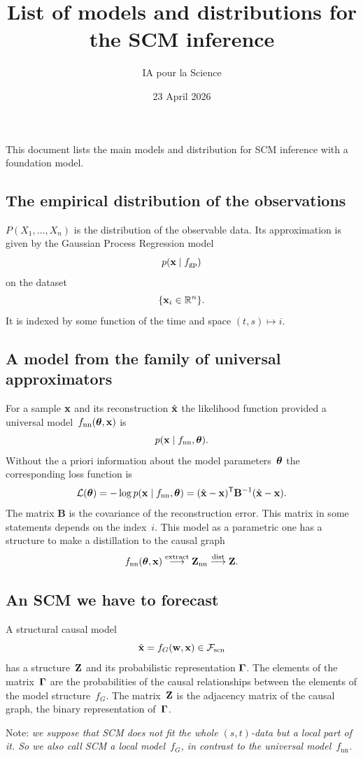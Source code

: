 \documentclass[12pt]{article}
\title{List of models and distributions for the SCM inference}
\author{IA pour la Science}
\date{23 April 2026}
\begin{document}
\maketitle

This document lists the main models and distribution for SCM inference with a foundation model.

\subsection*{The empirical distribution of the observations}
$P(X_1,\dots,X_n)$ is the distribution of the observable data.
Its approximation is given by the Gaussian Process Regression model
\[
p(\mathbf{x} \mid f_\text{gp})
\]
on the dataset~
\[\{\mathbf{x}_i\in\mathbb{R}^n\}.\]
It is indexed by some function of the time and space $(t,s)\mapsto i$.

\subsection*{A model from the family of universal approximators}
For a sample $\mathbf{x}$ and its reconstruction $\hat{\mathbf{x}}$ the likelihood function provided a universal model~$f_\text{nn}({\boldsymbol{\theta}},\mathbf{x})$ is
\[p(\mathbf{x}\mid f_\text{nn}, {\boldsymbol{\theta}}).\]
Without the a priori information about the model parameters~${\boldsymbol{\theta}}$ the corresponding loss function is
\[
\loss(\bth) = -\log p(\bx\mid f_\text{nn}, \bth) = (\hat{\bx} - \bx)\T \mathbf{B}^{-1}(\hat{\bx} - \bx).%
    \]
The matrix $\mathbf{B}$ is the covariance of the reconstruction error.
This matrix in some statements depends on the index~$i$.
This model as a parametric one has a structure to make a distillation to the causal graph
\[
f_\text{nn}({\boldsymbol{\theta}}, \mathbf{x})  \overset{\text{extract}}{\longrightarrow} \mathbf{Z}_\text{nn} \overset{\text{dist}}{\longrightarrow}  \mathbf{Z}.
\]

\subsection*{An SCM we have to forecast}
A structural causal model
\[
    \hat{\mathbf{x}} = f_G(\mathbf{w},\mathbf{x}) \in\mathcal{F}_\text{scn}
\]
has a structure~$\mathbf{Z}$ and its probabilistic representation ${\boldsymbol{\Gamma}}$.
The elements of the matrix~${\boldsymbol{\Gamma}}$ are the probabilities of the causal relationships between the elements of the model structure~$f_G$.
The matrix~$\mathbf{Z}$ is the adjacency matrix of the causal graph, the binary representation of~${\boldsymbol{\Gamma}}$.

\medskip
Note: \emph{we suppose that SCM does not fit the whole $(s,t)$-data but a local part of it.
So we also call SCM a local model~$f_G$, in contrast to the universal model~$f_\text{nn}$.}
\end{document}
